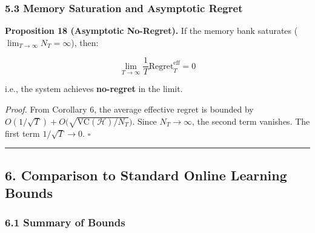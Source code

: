 \documentclass[
  12pt,
]{article}
\begin{document}
\subsubsection{5.3 Memory Saturation and Asymptotic
Regret}\label{memory-saturation-and-asymptotic-regret}

\textbf{Proposition 18 (Asymptotic No-Regret).} If the memory bank
saturates (\(\lim_{T\to\infty} N_T = \infty\)), then:

\[\lim_{T\to\infty} \frac{1}{T} \text{Regret}_T^{\text{eff}} = 0\]

i.e., the system achieves \textbf{no-regret} in the limit.

\emph{Proof.} From Corollary 6, the average effective regret is bounded
by \(O(1/\sqrt{T}) + O\bigl( \sqrt{\text{VC}(\mathcal{H})/N_T} \bigr)\).
Since \(N_T \to \infty\), the second term vanishes. The first term
\(1/\sqrt{T} \to 0\). \(\square\)

\begin{center}\rule{0.5\linewidth}{0.5pt}\end{center}

\subsection{6. Comparison to Standard Online Learning
Bounds}\label{comparison-to-standard-online-learning-bounds}

\subsubsection{6.1 Summary of Bounds}\label{summary-of-bounds}
\end{document}
